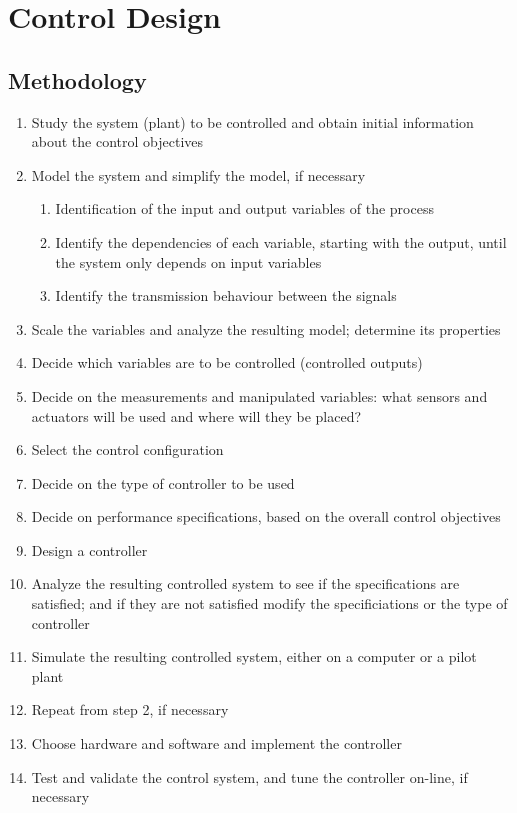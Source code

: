 \section{Control Design}
\subsection{Methodology}
\begin{enumerate}
	\item Study the system (plant) to be controlled and obtain initial information about the control objectives
	\item Model the system and simplify the model, if necessary
		\begin{enumerate}
			\item Identification of the input and output variables of the process
			\item Identify the dependencies of each variable, starting with the output, until the system only depends on input variables
			\item Identify the transmission behaviour between the signals
		\end{enumerate}
	\item Scale the variables and analyze the resulting model; determine its properties
	\item Decide which variables are to be controlled (controlled outputs)
	\item Decide on the measurements and manipulated variables: what sensors and actuators will be used and where will they be placed?
	\item Select the control configuration
	\item Decide on the type of controller to be used
	\item Decide on performance specifications, based on the overall control objectives
	\item Design a controller
	\item Analyze the resulting controlled system to see if the specifications are satisfied; and if they are not satisfied modify the specificiations or the type of controller
	\item Simulate the resulting controlled system, either on a computer or a pilot plant
	\item Repeat from step 2, if necessary
	\item Choose hardware and software and implement the controller
	\item Test and validate the control system, and tune the controller on-line, if necessary
\end{enumerate}



